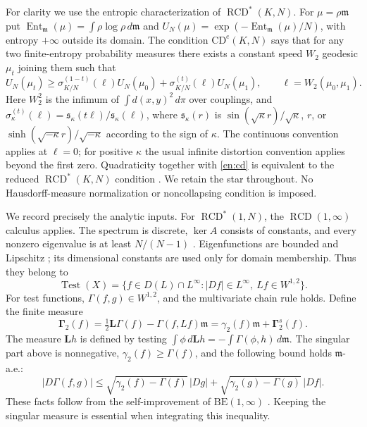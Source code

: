 \documentclass[12pt]{amsart}
\theoremstyle{definition}
\theoremstyle{remark}
\numberwithin{equation}{section}
\DeclareMathOperator{\Ent}{Ent}
\newcommand{\RCD}{\operatorname{RCD}^{*}}
\newcommand{\Test}{\operatorname{Test}}
\newcommand{\dm}{\,d\mathfrak m}
\theoremstyle{plain}
\begin{document}
For clarity we use the entropic characterization of $\RCD(K,N)$.
For $\mu=\rho\mathfrak m$ put
$\Ent_{\mathfrak m}(\mu)=\int\rho\log\rho\dm$ and
$U_N(\mu)=\exp(-\Ent_{\mathfrak m}(\mu)/N)$, with entropy $+\infty$
outside its domain. The condition $\mathrm{CD}^{e}(K,N)$ says that
for any two finite-entropy probability measures there exists a constant
speed $W_2$ geodesic $\mu_t$ joining them such that
\begin{equation}\label{en:cd}
 U_N(\mu_t)\geq
 \sigma_{K/N}^{(1-t)}(\ell)U_N(\mu_0)
 +\sigma_{K/N}^{(t)}(\ell)U_N(\mu_1),
 \qquad \ell=W_2(\mu_0,\mu_1).
\end{equation}
Here $W_2^2$ is the infimum of $\int d(x,y)^2\,d\pi$ over couplings,
and $\sigma_\kappa^{(t)}(\ell)=\mathfrak s_\kappa(t\ell)/
\mathfrak s_\kappa(\ell)$, where $\mathfrak s_\kappa(r)$ is
$\sin(\sqrt\kappa r)/\sqrt\kappa$, $r$, or
$\sinh(\sqrt{-\kappa}r)/\sqrt{-\kappa}$ according to the sign of $\kappa$.
The continuous convention applies at $\ell=0$; for positive $\kappa$
the usual infinite distortion convention applies beyond the first zero.
Quadraticity together with \eqref{en:cd} is equivalent to the reduced
$\operatorname{RCD}^{*}(K,N)$ condition
\cite[Theorem 3.17]{en:EKS}. We retain the star throughout.
No Hausdorff-measure normalization or noncollapsing condition is imposed.

We record precisely the analytic inputs. For $\RCD(1,N)$, the
$\operatorname{RCD}(1,\infty)$ calculus applies. The spectrum is discrete,
$\ker A$ consists of constants, and every nonzero eigenvalue is at least
$N/(N-1)$ \cite[Theorem 4.22]{en:EKS}. Eigenfunctions are bounded and
Lipschitz \cite[Proposition 7.1]{en:AHPT}; its dimensional constants are
used only for domain membership. Thus they belong to
\[
 \Test(X)=\{f\in D(L)\cap L^\infty:
       |Df|\in L^\infty,\ Lf\in W^{1,2}\}.
\]
For test functions, $\Gamma(f,g)\in W^{1,2}$, and the multivariate chain
rule holds. Define the finite measure
\[
 \boldsymbol\Gamma_2(f)=\tfrac12\boldsymbol L\Gamma(f)
                         -\Gamma(f,Lf)\mathfrak m
 =\gamma_2(f)\mathfrak m+\boldsymbol\Gamma_2^s(f).
\]
The measure $\boldsymbol Lh$ is defined by testing
$\int\phi\,d\boldsymbol Lh=-\int\Gamma(\phi,h)\dm$.
The singular part above is nonnegative, $\gamma_2(f)\geq\Gamma(f)$,
and the following bound holds $\mathfrak m$-a.e.:
\begin{equation}\label{en:selfimprove}
 |D\Gamma(f,g)|\leq
 \sqrt{\gamma_2(f)-\Gamma(f)}\,|Dg|
 +\sqrt{\gamma_2(g)-\Gamma(g)}\,|Df|.
\end{equation}
These facts follow from the self-improvement of $\mathrm{BE}(1,\infty)$
\cite[Lemma 3.2 and Theorem 3.4, (3.16)]{en:S}.
Keeping the singular measure is essential when integrating this inequality.
\end{document}
